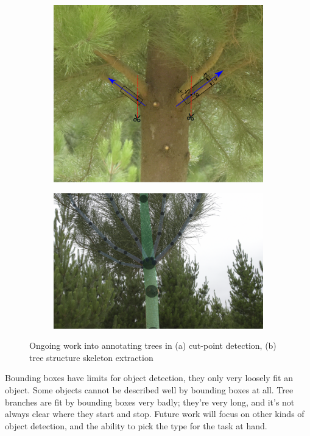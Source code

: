\begin{figure}[h!]
\begin{subfigure}[t]{1.0\linewidth}
  \centering
  \includegraphics[width=0.8\linewidth]{figures/future/tree_cutpoint.pdf}
  \caption{} 
\end{subfigure}

\begin{subfigure}[t]{1.0\linewidth}
  \centering
  \includegraphics[width=0.8\linewidth]{figures/future/tree_branches.jpg}
  \caption{} 
\end{subfigure}
\caption{Ongoing work into annotating trees in (a) cut-point detection, (b) tree structure skeleton extraction }
\label {fig:future_trees}
\end{figure}

Bounding boxes have limits for object detection, they only very loosely fit an object. Some objects cannot be described well by bounding boxes at all. Tree branches are fit by bounding boxes very badly; they're very long, and it's not always clear where they start and stop. Future work will focus on other kinds of object detection, and the ability to pick the type for the task at hand.

